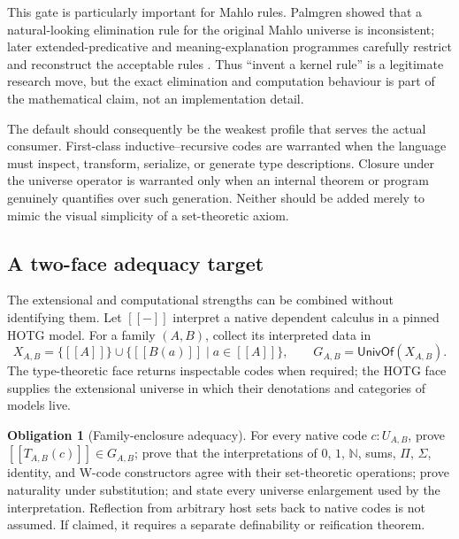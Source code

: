 \documentclass[11pt]{article}
\theoremstyle{definition}
\newtheorem{obligation}[theorem]{Obligation}
\theoremstyle{remark}
\newcommand{\sem}[1]{[\![#1]\!]}
\begin{document}
This gate is particularly important for Mahlo rules.  Palmgren showed that a
natural-looking elimination rule for the original Mahlo universe is
inconsistent; later extended-predicative and meaning-explanation programmes
carefully restrict and reconstruct the acceptable rules
\cite{PalmgrenUniverses,KahleSetzerExtendedMahlo,DybjerSetzerPredicativity}.
Thus ``invent a kernel rule'' is a legitimate research move, but the exact
elimination and computation behaviour is part of the mathematical claim, not an
implementation detail.

The default should consequently be the weakest profile that serves the actual
consumer.  First-class inductive--recursive codes are warranted when the
language must inspect, transform, serialize, or generate type descriptions.
Closure under the universe operator is warranted only when an internal theorem
or program genuinely quantifies over such generation.  Neither should be added
merely to mimic the visual simplicity of a set-theoretic axiom.

\subsection{A two-face adequacy target}

The extensional and computational strengths can be combined without identifying
them.  Let $\sem{-}$ interpret a native dependent calculus in a
pinned HOTG model.  For a family $(A,B)$, collect its interpreted data in
\[
  X_{A,B}=\{\sem{A}\}\cup
    \{\sem{B(a)}\mid a\in\sem{A}\},
  \qquad
  G_{A,B}=\mathsf{UnivOf}(X_{A,B}).                       \tag{5}
\]
The type-theoretic face returns inspectable codes when required; the HOTG face
supplies the extensional universe in which their denotations and categories of
models live.

\begin{obligation}[Family-enclosure adequacy]
For every native code $c:U_{A,B}$, prove
$\sem{T_{A,B}(c)}\in G_{A,B}$; prove that the interpretations of
$0$, $1$, $\mathbb N$, sums, $\Pi$, $\Sigma$, identity, and W-code constructors
agree with their set-theoretic operations; prove naturality under substitution;
and state every universe enlargement used by the interpretation.  Reflection
from arbitrary host sets back to native codes is not assumed.  If claimed, it
requires a separate definability or reification theorem.
\end{obligation}
\end{document}

